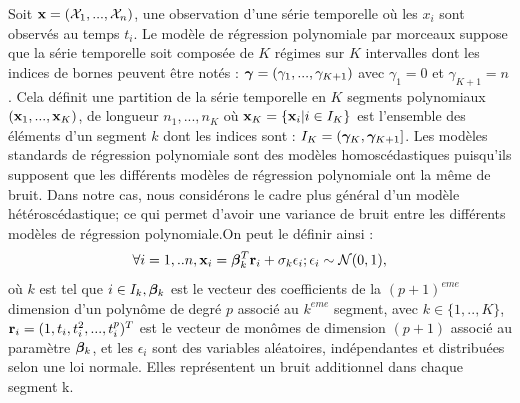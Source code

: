 \documentclass[12pt]{article}
\begin{document}
Soit ${\mathbf{x}}= ({\mathcal{X}}_{1},...,{\mathcal{X}}_{n})$, une observation d'une série temporelle où les $x_{i}$ sont observés au temps $t_{i}$. Le modèle de régression polynomiale par morceaux suppose que la série temporelle soit composée de $K$ régimes sur $K$ intervalles dont les indices de bornes peuvent être notés : $\boldsymbol{\gamma}=(\gamma_{1},...,\gamma_{K+1})$ avec $\gamma_{1}=0$ et $\gamma_{K+1}=n$. Cela définit une partition de la série temporelle en $K$ segments polynomiaux $({\mathbf{x}}_{1},...,{\mathbf{x}}_{K})$, de longueur $n_{1},...,n_{K}$ où ${\mathbf{x}}_{K}=\{{\mathbf{x}}_{i}| i\in I_{K}\}$ est l'ensemble des éléments d'un segment $k$ dont les indices sont : $I_{K}=(\boldsymbol{\gamma}_{K},\boldsymbol{\gamma}_{K+1}]$. Les modèles standards de régression polynomiale sont des modèles homoscédastiques puisqu'ils supposent que les différents modèles de régression polynomiale ont la même de bruit. Dans notre cas, nous considérons le cadre plus général d'un modèle hétéroscédastique; ce qui permet d'avoir une variance de bruit entre les différents modèles de régression polynomiale.On peut le définir ainsi : 
\begin{equation}
\forall{i}=1,..n, {\mathbf{x}}_{i}=\boldsymbol{\beta}^{T}_{k}\mathbf{r}_{i} + \sigma_{k}\epsilon_{i}; \epsilon_{i}\sim \mathcal{N} (0,1),
\label{eq:Hyp1}
\end{equation}
où $k$ est tel que $i\in I_{k}, \boldsymbol{\beta}_{k}$ est le vecteur des coefficients de la $(p+1)^{eme}$ dimension d'un polynôme de degré $p$ associé au $k^{eme}$ segment, avec $k\in \{1,..,K\}$, 
$\mathbf{r}_{i}=(1,t_{i},t_{i}^{2},...,t_{i}^{p})^T$ est le vecteur de monômes de dimension $(p+1)$ associé au paramètre $\boldsymbol{\beta}_{k}$, et les $\epsilon_{i}$ sont des variables aléatoires, indépendantes et distribuées selon une loi normale. Elles représentent un bruit additionnel dans chaque segment k.  
\end{document}
